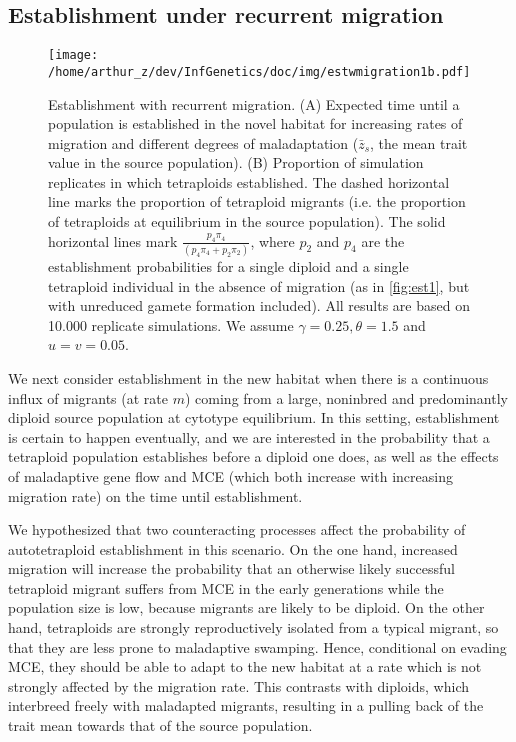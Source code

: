\documentclass[12pt,a4paper]{article}
\begin{document}
\subsection*{Establishment under recurrent migration}

\begin{figure}[t]
\centering
\texttt{[image: /home/arthur\_z/dev/InfGenetics/doc/img/estwmigration1b.pdf]}
\caption{
Establishment with recurrent migration.
(A) Expected time until a population is established in the novel habitat for
increasing rates of migration and different degrees of maladaptation
($\bar{z}_s$, the mean trait value in the source population). 
(B) Proportion of simulation replicates in which tetraploids established. 
The dashed horizontal line marks the proportion of tetraploid migrants (i.e.
the proportion of tetraploids at equilibrium in the source population).
The solid horizontal lines mark $\frac{p_4\pi_4}{(p_4\pi_4 + p_2\pi_2)}$, where $p_2$ and
$p_4$ are the establishment probabilities for a single diploid and a single
tetraploid individual in the absence of migration (as in \cref{fig:est1}, but
with unreduced gamete formation included).
All results are based on 10.000 replicate simulations.
We assume $\gamma=0.25, \theta=1.5$ and $u=v=0.05$.
\label{fig:estwmig}}
\end{figure}

We next consider establishment in the new habitat when there is a continuous
influx of migrants (at rate $m$) coming from a large, noninbred and
predominantly diploid source population at cytotype equilibrium.
In this setting, establishment is certain to happen eventually, and we are
interested in the probability that a tetraploid population establishes before a
diploid one does, as well as the effects of maladaptive gene flow and MCE
(which both increase with increasing migration rate) on the time until
establishment.

We hypothesized that two counteracting processes affect the probability of
autotetraploid establishment in this scenario.
On the one hand, increased migration will increase the probability that an
otherwise likely successful tetraploid migrant suffers from MCE in the early
generations while the population size is low, because migrants are likely to be
diploid.
On the other hand, tetraploids are strongly reproductively isolated from
a typical migrant, so that they are less prone to maladaptive swamping.
Hence, conditional on evading MCE, they should be able to adapt to the new
habitat at a rate which is not strongly affected by the migration rate.
This contrasts with diploids, which interbreed freely with maladapted
migrants, resulting in a pulling back of the trait mean towards that of the
source population.
\end{document}
